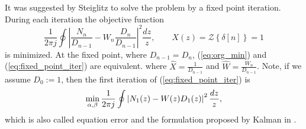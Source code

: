 \documentclass[10pt]{amsart}
\begin{document}
It was suggested by Steiglitz to solve the problem by a fixed
point iteration. During each iteration the objective function
\begin{equation}
	\label{eq:fixed_point_iter}
	\frac{1}{2 \pi j} \oint \left| \frac{N_n}{D_{n-1}} - W_n \frac{D_{n}}{D_{n-1}} \right|^2 \frac{dz}{z},
   \qquad
    X(z) = \mathcal{Z}\left\{ \delta[n]\right\} = 1
\end{equation}
is minimized.
At the fixed point, where $D_{n-1}=D_n$, (\ref{eq:org_min}) and (\ref{eq:fixed_point_iter}) are equivalent. 
where $\hat X = \frac{1}{D_{n-1}}$ and $\hat W = \frac{W_n}{D_{n-1}}$. 
Note, if we assume $D_0:=1$, then the first iteration of (\ref{eq:fixed_point_iter}) is
\begin{equation}
	\min_{{\bf \alpha},{\bf \beta}} \frac{1}{2 \pi j} \oint \left| N_1(z) - W(z) D_1(z) \right|^2 \frac{dz}{z},
	\label{eq:kalman}
\end{equation}
which is also called equation error and the formulation proposed by Kalman in \cite{R.E.Kalman1958}. 
\end{document}
